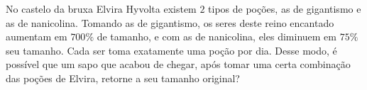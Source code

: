 No castelo da bruxa Elvira Hyvolta existem $2$ tipos de poções, as de gigantismo e as de nanicolina.
Tomando as de gigantismo, os seres deste reino encantado aumentam em $700\%$ de tamanho, e com as de nanicolina, eles diminuem em $75\%$ seu tamanho.
Cada ser toma exatamente uma poção por dia.
Desse modo, é possível que um sapo que acabou de chegar,
após tomar uma certa
combinação
das poções de Elvira,
retorne a seu tamanho original?
